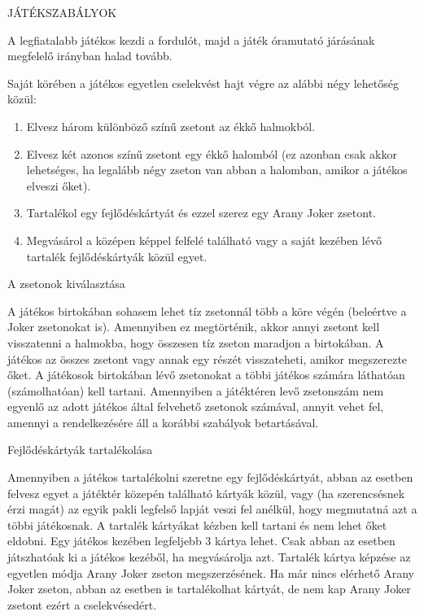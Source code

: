 \vspace{3cm}

JÁTÉKSZABÁLYOK\par
A legfiatalabb játékos kezdi a fordulót, majd a játék óramutató járásának megfelelő irányban halad tovább.\par 
\vspace{1cm}
Saját körében a játékos egyetlen cselekvést hajt végre az alábbi négy lehetőség közül:
\begin{enumerate}
\item Elvesz három különböző színű zsetont az ékkő halmokból.
\item Elvesz két azonos színű zsetont egy ékkő halomból (ez
azonban csak akkor lehetséges, ha legalább négy zseton van
abban a halomban, amikor a játékos elveszi őket).
\item Tartalékol egy fejlődéskártyát és ezzel szerez egy Arany Joker zsetont.
\item Megvásárol a középen képpel felfelé található vagy a
saját kezében lévő tartalék fejlődéskártyák közül egyet.
\end{enumerate}\par

A zsetonok kiválasztása\par
A játékos birtokában sohasem lehet tíz zsetonnál több a köre végén (beleértve a Joker zsetonokat is). Amennyiben ez megtörténik, akkor annyi zsetont kell visszatenni a halmokba, hogy összesen tíz zseton maradjon a birtokában. A játékos az összes zsetont vagy annak egy részét visszateheti, amikor megszerezte őket. A játékosok birtokában lévő zsetonokat a többi játékos számára láthatóan (számolhatóan) kell tartani. Amennyiben a játéktéren levő zsetonszám nem egyenlő az adott játékos által felvehető zsetonok számával, annyit vehet fel, amennyi a rendelkezésére áll a korábbi szabályok betartásával.\par

Fejlődéskártyák tartalékolása\par
Amennyiben a játékos tartalékolni szeretne egy fejlődéskártyát, abban az esetben felvesz egyet a játéktér közepén található kártyák közül, vagy (ha szerencsésnek érzi magát) az egyik pakli legfelső lapját veszi fel anélkül, hogy megmutatná azt a többi játékosnak. A tartalék kártyákat kézben kell tartani és nem lehet őket eldobni. Egy játékos kezében legfeljebb 3 kártya lehet. Csak abban az esetben játszhatóak ki a játékos kezéből, ha megvásárolja azt. Tartalék kártya képzése az egyetlen módja Arany Joker zseton megszerzésének. Ha már nincs elérhető Arany Joker zseton, abban az esetben is tartalékolhat kártyát, de nem kap Arany Joker zsetont ezért a cselekvésedért.\par

